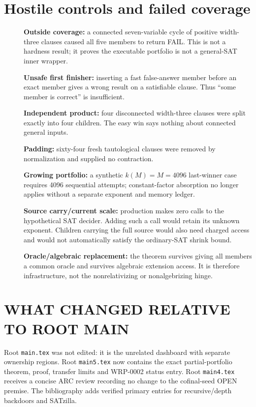 \documentclass[11pt]{article}
\begin{document}
\section*{Hostile controls and failed coverage}
\begin{description}
\item[] \textbf{Outside coverage:} a connected seven-variable cycle of
positive width-three clauses caused all five members to return FAIL.  This is
not a hardness result; it proves the executable portfolio is not a general-SAT
inner wrapper.
\item[] \textbf{Unsafe first finisher:} inserting a fast false-answer member
before an exact member gives a wrong result on a satisfiable clause.  Thus
``some member is correct'' is insufficient.
\item[] \textbf{Independent product:} four disconnected width-three clauses
were split exactly into four children.  The easy win says nothing about
connected general inputs.
\item[] \textbf{Padding:} sixty-four fresh tautological clauses were removed
by normalization and supplied no contraction.
\item[] \textbf{Growing portfolio:} a synthetic $k(M)=M=4096$ last-winner
case requires 4096 sequential attempts; constant-factor absorption no longer
applies without a separate exponent and memory ledger.
\item[] \textbf{Source carry/current scale:} production makes zero calls to
the hypothetical SAT decider.  Adding such a call would retain its unknown
exponent.  Children carrying the full source would also need charged access
and would not automatically satisfy the ordinary-SAT shrink bound.
\item[] \textbf{Oracle/algebraic replacement:} the theorem survives giving
all members a common oracle and survives algebraic extension access.  It is
therefore infrastructure, not the nonrelativizing or nonalgebrizing hinge.
\end{description}

\section*{WHAT CHANGED RELATIVE TO ROOT MAIN}
Root \texttt{main.tex} was not edited: it is the unrelated dashboard with
separate ownership regions.  Root \texttt{main5.tex} now contains the exact
partial-portfolio theorem, proof, transfer limits and WRP-0002 status entry.
Root \texttt{main4.tex} receives a concise ARC review recording no change to
the cofinal-seed OPEN premise.  The bibliography adds verified primary entries
for recursive/depth backdoors and SATzilla.
\end{document}
